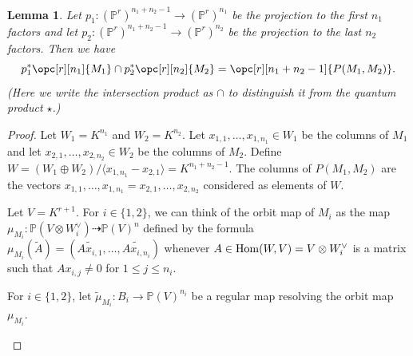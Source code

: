 \documentclass[12pt]{amsart}
\newcommand{\mb}{\mathbb}
\newcommand{\wt}{\widetilde}
\newcommand{\Hom}{{\rm Hom}}
\theoremstyle{plain}
\newtheorem{Lem}[Thm]{Lemma}
\theoremstyle{definition}
\theoremstyle{remark}
\begin{document}
\begin{Lem}\label{parlem}
Let $p_1 : (\mb{P}^r)^{n_1 + n_2 - 1} \to (\mb{P}^r)^{n_1}$ be the projection to the first $n_1$ factors and let $p_2 : (\mb{P}^r)^{n_1 + n_2 - 1} \to (\mb{P}^r)^{n_2}$ be the projection to the last $n_2$ factors. Then we have $$p_1^*\opc[r][n_1]{M_1} \cap p_2^*\opc[r][n_2]{M_2}=\opc[r][n_1+n_2-1]{P(M_1,M_2)}.$$ (Here we write the intersection product as $\cap$ to distinguish it from the quantum product $\star$.)
\end{Lem}
\begin{proof}


Let $W_1 = K^{n_1}$ and $W_2 = K^{n_2}$. Let $x_{1, 1}, \ldots, x_{1, n_1} \in W_1$ be the columns of $M_1$ and let $x_{2, 1}, \ldots, x_{2, n_2} \in W_2$ be the columns of $M_2$. Define $W = (W_1 \oplus W_2) / \langle x_{1, n_1} - x_{2, 1}\rangle = K^{n_1 + n_2-1}$. The columns of $P(M_1, M_2)$ are the vectors $x_{1, 1}, \ldots, x_{1, n_1} = x_{2, 1}, \ldots, x_{2, n_2}$ considered as elements of $W$.

Let $V = K^{r+1}$. For $i \in \{1,2\}$, we can think of the orbit map of $M_i$ as the map $\mu_{M_i} : \mb{P}(V \otimes W_i^\vee) \dashrightarrow \mb{P}(V)^n$ defined by the formula $\mu_{M_i}(\wt A) = (\wt{Ax_{i,1}}, \ldots, \wt{Ax_{i,n_i}})$ whenever $A \in \Hom(W, V) = V \otimes W_i^\vee$ is a matrix such that $A x_{i,j} \neq 0$ for $1 \leq j \leq n_i$.











For $i \in \{1, 2\}$, let $\wt \mu_{M_i} : B_i \to \mb{P}(V)^{n_i}$ be a regular map resolving the orbit map $\mu_{M_i}$.
\begin{center}
\end{center}


\end{proof}
\end{document}
